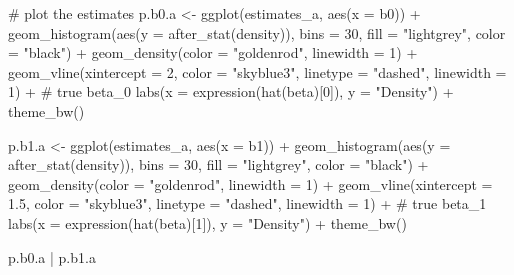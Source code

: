 \documentclass[
]{article}
\newenvironment{Shaded}{\begin{snugshade}}{\end{snugshade}}
\newcommand{\AttributeTok}[1]{\textcolor[rgb]{0.40,0.45,0.13}{#1}}
\newcommand{\CommentTok}[1]{\textcolor[rgb]{0.37,0.37,0.37}{#1}}
\newcommand{\DecValTok}[1]{\textcolor[rgb]{0.68,0.00,0.00}{#1}}
\newcommand{\FloatTok}[1]{\textcolor[rgb]{0.68,0.00,0.00}{#1}}
\newcommand{\FunctionTok}[1]{\textcolor[rgb]{0.28,0.35,0.67}{#1}}
\newcommand{\NormalTok}[1]{\textcolor[rgb]{0.00,0.23,0.31}{#1}}
\newcommand{\OtherTok}[1]{\textcolor[rgb]{0.00,0.23,0.31}{#1}}
\newcommand{\SpecialCharTok}[1]{\textcolor[rgb]{0.37,0.37,0.37}{#1}}
\newcommand{\StringTok}[1]{\textcolor[rgb]{0.13,0.47,0.30}{#1}}
\begin{document}
\begin{Shaded}
\begin{Highlighting}[numbers=left,,]
\CommentTok{\# plot the estimates}
\NormalTok{p.b0.a }\OtherTok{\textless{}{-}} \FunctionTok{ggplot}\NormalTok{(estimates\_a, }\FunctionTok{aes}\NormalTok{(}\AttributeTok{x =}\NormalTok{ b0)) }\SpecialCharTok{+}
  \FunctionTok{geom\_histogram}\NormalTok{(}\FunctionTok{aes}\NormalTok{(}\AttributeTok{y =} \FunctionTok{after\_stat}\NormalTok{(density)), }\AttributeTok{bins =} \DecValTok{30}\NormalTok{,}
                 \AttributeTok{fill =} \StringTok{"lightgrey"}\NormalTok{, }\AttributeTok{color =} \StringTok{"black"}\NormalTok{) }\SpecialCharTok{+}
  \FunctionTok{geom\_density}\NormalTok{(}\AttributeTok{color =} \StringTok{"goldenrod"}\NormalTok{, }\AttributeTok{linewidth =} \DecValTok{1}\NormalTok{) }\SpecialCharTok{+}
  \FunctionTok{geom\_vline}\NormalTok{(}\AttributeTok{xintercept =} \DecValTok{2}\NormalTok{, }\AttributeTok{color =} \StringTok{"skyblue3"}\NormalTok{,}
             \AttributeTok{linetype =} \StringTok{"dashed"}\NormalTok{, }\AttributeTok{linewidth =} \DecValTok{1}\NormalTok{) }\SpecialCharTok{+}       \CommentTok{\# true beta\_0}
  \FunctionTok{labs}\NormalTok{(}\AttributeTok{x =} \FunctionTok{expression}\NormalTok{(}\FunctionTok{hat}\NormalTok{(beta)[}\DecValTok{0}\NormalTok{]), }\AttributeTok{y =} \StringTok{"Density"}\NormalTok{) }\SpecialCharTok{+}
  \FunctionTok{theme\_bw}\NormalTok{()}

\NormalTok{p.b1.a }\OtherTok{\textless{}{-}} \FunctionTok{ggplot}\NormalTok{(estimates\_a, }\FunctionTok{aes}\NormalTok{(}\AttributeTok{x =}\NormalTok{ b1)) }\SpecialCharTok{+}
  \FunctionTok{geom\_histogram}\NormalTok{(}\FunctionTok{aes}\NormalTok{(}\AttributeTok{y =} \FunctionTok{after\_stat}\NormalTok{(density)), }\AttributeTok{bins =} \DecValTok{30}\NormalTok{,}
                 \AttributeTok{fill =} \StringTok{"lightgrey"}\NormalTok{, }\AttributeTok{color =} \StringTok{"black"}\NormalTok{) }\SpecialCharTok{+}
  \FunctionTok{geom\_density}\NormalTok{(}\AttributeTok{color =} \StringTok{"goldenrod"}\NormalTok{, }\AttributeTok{linewidth =} \DecValTok{1}\NormalTok{) }\SpecialCharTok{+}
  \FunctionTok{geom\_vline}\NormalTok{(}\AttributeTok{xintercept =} \FloatTok{1.5}\NormalTok{, }\AttributeTok{color =} \StringTok{"skyblue3"}\NormalTok{,}
             \AttributeTok{linetype =} \StringTok{"dashed"}\NormalTok{, }\AttributeTok{linewidth =} \DecValTok{1}\NormalTok{) }\SpecialCharTok{+}       \CommentTok{\# true beta\_1}
  \FunctionTok{labs}\NormalTok{(}\AttributeTok{x =} \FunctionTok{expression}\NormalTok{(}\FunctionTok{hat}\NormalTok{(beta)[}\DecValTok{1}\NormalTok{]), }\AttributeTok{y =} \StringTok{"Density"}\NormalTok{) }\SpecialCharTok{+}
  \FunctionTok{theme\_bw}\NormalTok{()}

\NormalTok{p.b0.a }\SpecialCharTok{|}\NormalTok{ p.b1.a}
\end{Highlighting}
\end{Shaded}
\end{document}
